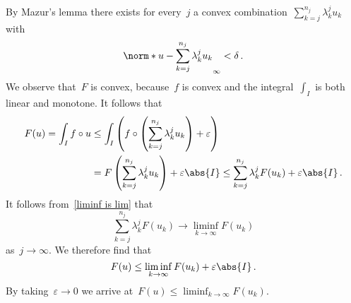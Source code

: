 By Mazur’s lemma there exists for every~$j$ a convex combination~$\sum_{k=j}^{n_j} \lambda^j_k u_k$ with
\[
  \norm*{u - \sum_{k=j}^{n_j} \lambda^j_k u_k}_{\infty}
  <
  \delta \,.
\]
We observe that~$F$ is convex, because~$f$ is convex and the integral~$\int_I$ is both linear and monotone.
It follows that
\begin{align*}
  F(u)
  =
  \int_I f \circ u
  &\leq
  \int_I \left( f \circ \left( \sum_{k=j}^{n_j} \lambda^j_k u_k \right) + \varepsilon \right)
  \\
  &=
  F\left( \sum_{k=j}^{n_j} \lambda^j_k u_k \right) + \varepsilon \abs{I}
  \leq
  \sum_{k=j}^{n_j} \lambda^j_k F(u_k) + \varepsilon \abs{I} \,.
\end{align*}
It follows from~\eqref{liminf is lim} that
\[
  \sum_{k=j}^{n_j} \lambda^j_k F(u_k)
  \to
  \liminf_{k \to \infty} F(u_k)
\]
as~$j \to \infty$.
We therefore find that
\[
  F(u)
  \leq
  \liminf_{k \to \infty} F(u_k) + \varepsilon \abs{I} \,.
\]
By taking~$\varepsilon \to 0$ we arrive at~$F(u) \leq \liminf_{k \to \infty} F(u_k)$.
































